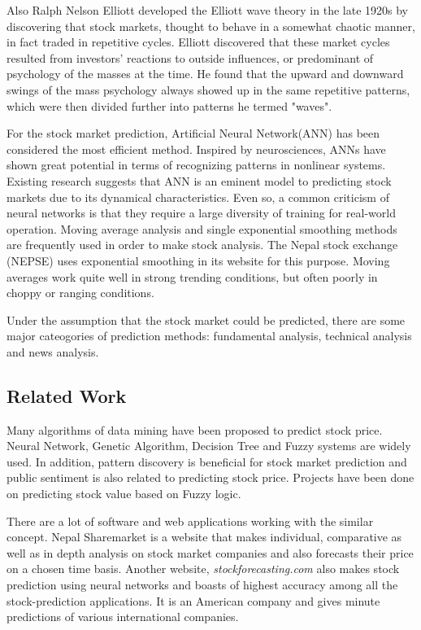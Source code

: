 Also Ralph Nelson Elliott developed the \cite{wav} Elliott wave theory in the late 1920s by discovering that stock markets, thought to behave in a somewhat chaotic manner, in fact traded in repetitive cycles. Elliott discovered that these market cycles resulted from investors' reactions to outside influences, or predominant of psychology of the masses at the time. He found that the upward and downward swings of the mass psychology always showed up in the same repetitive patterns, which were then divided further into patterns he termed "waves".

For the stock market prediction, Artificial Neural Network(ANN) has been considered the most efficient method. Inspired by neurosciences, ANNs have shown great potential in terms of recognizing patterns in nonlinear systems. Existing research suggests that ANN is an eminent model to predicting stock markets due to its dynamical characteristics. Even so, a common criticism of neural networks is that they require a large diversity of training for real-world operation. Moving average analysis and single exponential smoothing methods are frequently used in order to make stock analysis. The Nepal stock exchange (NEPSE) uses exponential smoothing in its website for this purpose. Moving averages work quite well in strong trending conditions, but often poorly in choppy or ranging conditions.

Under the assumption that the stock market could be predicted, there are some major cateogories of prediction methods: fundamental analysis, technical analysis and news analysis.


\subsection{Related Work}
Many algorithms of data mining have been proposed to predict stock price. Neural Network, Genetic Algorithm, Decision Tree and Fuzzy systems are widely used. In addition, pattern discovery is beneficial for stock market prediction and public sentiment is also related to predicting stock price. Projects have been done on predicting stock value based on Fuzzy logic.

There are a lot of software and web applications working with the similar concept. Nepal Sharemarket is a website that makes individual, comparative as well as in depth analysis on stock market companies and also forecasts their price on a chosen time basis. Another website, \textit{stockforecasting.com} also makes stock prediction using neural networks and boasts of highest accuracy among all the stock-prediction applications. It is an American company and gives minute predictions of various international companies.

